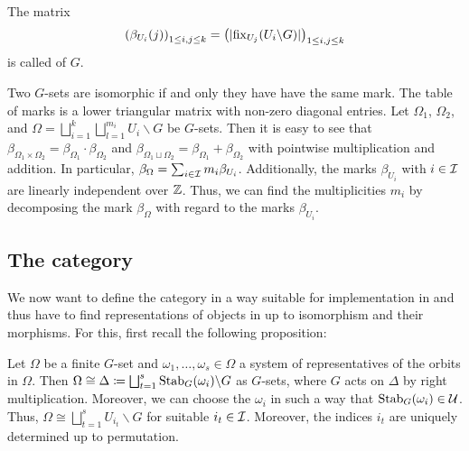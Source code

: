 \begin{defn}
The matrix \[\left(\beta_{U_i}(j)\right)_{1 \leq i,j \leq k} = \left({\lvert\operatorname{fix}_{U_j}(U_i \backslash G)\rvert}\right)_{1 \leq i,j \leq k}\] is called  of $G$.
\end{defn}

\begin{rem}\label{rem:properties_of_marks}
Two $G$-sets are isomorphic if and only they have have the same mark. The table of marks is a lower triangular matrix with non-zero diagonal entries. Let $\Omega_1$, $\Omega_2$, and $\Omega = \bigsqcup_{i=1}^k \bigsqcup_{l=1}^{m_i} U_i \backslash G$ be $G$-sets. Then it is easy to see that $\beta_{\Omega_1 \times \Omega_2} = \beta_{\Omega_1} \cdot \beta_{\Omega_2}$ and $\beta_{\Omega_1 \sqcup{} \Omega_2} = \beta_{\Omega_1} + \beta_{\Omega_2}$ with pointwise multiplication and addition. In particular, $\beta_\Omega = \sum_{i \in \mathcal{I}} m_i \beta_{U_i}$. Additionally, the marks $\beta_{U_i}$ with $i \in \mathcal{I}$ are linearly independent over $\mathbb{Z}$. Thus, we can find the multiplicities $m_i$ by decomposing the mark $\beta_\Omega$ with regard to the marks $\beta_{U_i}$.
\end{rem}

\subsection{The category \SkeletalGSets{}}

We now want to define the category \SkeletalGSets{} in a way suitable for implementation in \CapPkg{} and thus have to find representations of objects in \Gset{} up to isomorphism and their morphisms. For this, first recall the following proposition:

\begin{prop}\label{prop:classification_of_finite_G_sets}
Let $\Omega$ be a finite $G$-set and $\omega_1,\dots,\omega_s \in \Omega$ a system of representatives of the orbits in $\Omega$. Then $\Omega \cong \Delta \coloneqq \bigsqcup_{t=1}^s \operatorname{Stab}_G(\omega_i) \backslash G$ as $G$-sets, where $G$ acts on $\Delta$ by right multiplication. Moreover, we can choose the $\omega_i$ in such a way that $\operatorname{Stab}_G(\omega_i) \in \mathcal{U}$. Thus, $\Omega \cong \bigsqcup_{t=1}^s U_{i_t} \backslash G$ for suitable $i_t \in \mathcal{I}$. Moreover, the indices $i_t$ are uniquely determined up to permutation.
\end{prop}

